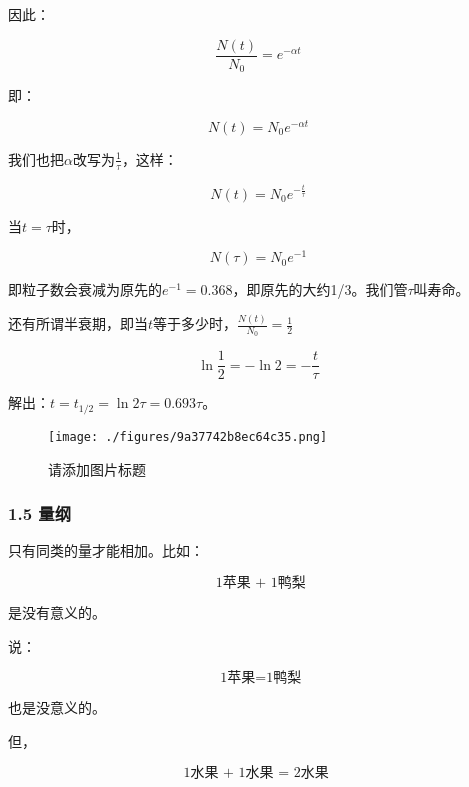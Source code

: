 因此：

\begin{equation}
\frac{N(t)}{N_0} = e^{- \alpha t}~
\end{equation}

即：

\begin{equation}
N(t) = N_0 e^{- \alpha t}~
\end{equation}

我们也把$\alpha$改写为$\frac{1}{\tau}$，这样：

\begin{equation}
N(t) = N_0 e^{- \frac{t}{\tau}}~
\end{equation}

当$t = \tau$时，

\begin{equation}
N(\tau) = N_0 e^{-1}~
\end{equation}

即粒子数会衰减为原先的$e^{-1} = 0.368$，即原先的大约1/3。我们管$\tau$叫寿命。

还有所谓半衰期，即当$t$等于多少时，$\frac{N(t)}{N_0} = \frac{1}{2}$

\begin{equation}
\ln \frac{1}{2} = - \ln 2 = - \frac{t }{\tau}~
\end{equation}

解出：$t = t_{1/2} = \ln 2 \tau = 0.693 \tau$。
\begin{figure}[ht]
\centering
\texttt{[image: ./figures/9a37742b8ec64c35.png]}
\caption{请添加图片标题} \label{fig_QMPre_1}
\end{figure}

\subsubsection{1.5 量纲}

只有同类的量才能相加。比如：

\begin{equation}
\text{ 1苹果 + 1鸭梨}~
\end{equation}

是没有意义的。

说：

\begin{equation}
\text{ 1苹果=1鸭梨}~
\end{equation}

也是没意义的。

但，

\begin{equation}
\text{1水果 + 1水果 = 2水果 }~
\end{equation}

